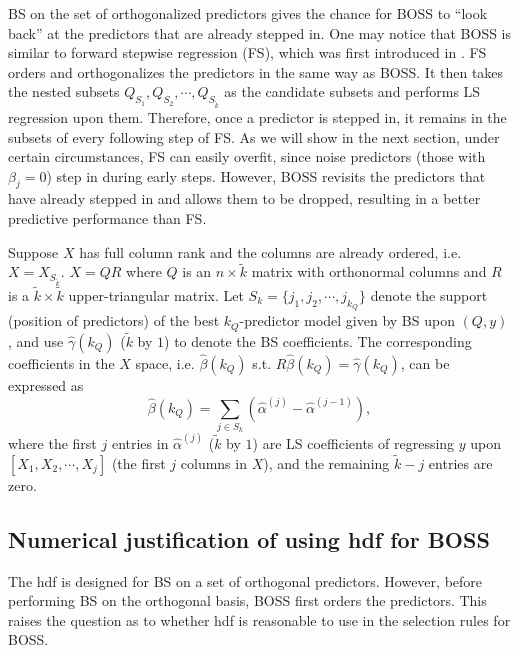 BS on the set of orthogonalized predictors gives the chance for BOSS to ``look back'' at the predictors that are already stepped in. One may notice that BOSS is similar to forward stepwise regression (FS), which was first introduced in \citet{efroymson1960multiple}. FS orders and orthogonalizes the predictors in the same way as BOSS. It then takes the nested subsets $Q_{S_1}, Q_{S_2}, \cdots, Q_{S_{\tilde{k}} }$ as the candidate subsets and performs LS regression upon them. Therefore, once a predictor is stepped in, it remains in the subsets of every following step of FS. As we will show in the next section, under certain circumstances, FS can easily overfit, since noise predictors (those with $\beta_j=0$) step in during early steps. However, BOSS revisits the predictors that have already stepped in and allows them to be dropped, resulting in a better predictive performance than FS.

\begin{theorem} 
	Suppose $X$ has full column rank and the columns are already ordered, i.e. $X=X_{S_{\tilde{k}}}$. $X=QR$ where $Q$ is an $n \times \tilde{k}$ matrix with orthonormal columns and $R$ is a $\tilde{k} \times \tilde{k}$ upper-triangular matrix. Let $S_k=\{j_1,j_2,\cdots,j_{k_Q}\}$ denote the support (position of predictors) of the best $k_Q$-predictor model given by BS upon $(Q,y)$, and use $\hat{\gamma}(k_Q)$ ($\tilde{k}$ by $1$) to denote the BS coefficients. The corresponding coefficients in the $X$ space, i.e. $\hat{\beta}(k_Q)$ s.t. $R\hat{\beta}(k_Q)=\hat{\gamma}(k_Q)$, can be expressed as
	\begin{equation*}
	\hat{\beta}(k_Q) = \sum_{j\in S_k} \left(\hat{\alpha}^{(j)} - \hat{\alpha}^{(j-1)}\right),
	\end{equation*}
	where the first $j$ entries in $\hat{\alpha}^{(j)}$ ($\tilde{k}$ by $1$) are LS coefficients of regressing $y$ upon $[X_1,X_2,\cdots,X_j]$ (the first $j$ columns in $X$), and the remaining $\tilde{k}-j$ entries are zero.

	\label{thm:correspondence}
\end{theorem}

\subsection{Numerical justification of using hdf for BOSS}
The hdf is designed for BS on a set of orthogonal predictors. However, before performing BS on the orthogonal basis, BOSS first orders the predictors. This raises the question as to whether hdf is reasonable to use in the selection rules for BOSS. 

